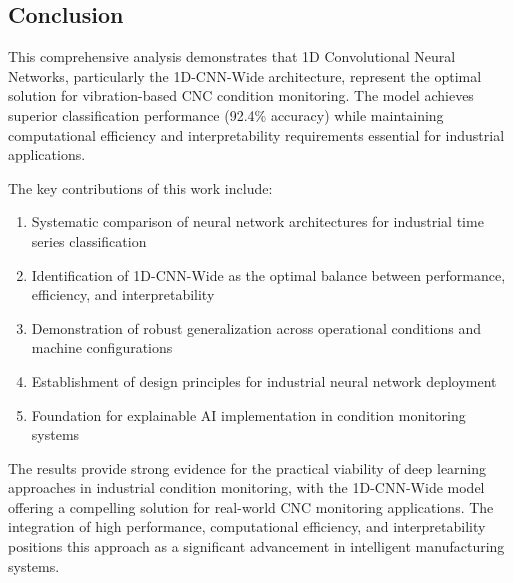 \documentclass[12pt]{article}
\begin{document}
\subsection{Conclusion}

This comprehensive analysis demonstrates that 1D Convolutional Neural Networks, particularly the 1D-CNN-Wide architecture, represent the optimal solution for vibration-based CNC condition monitoring. The model achieves superior classification performance (92.4\% accuracy) while maintaining computational efficiency and interpretability requirements essential for industrial applications.

The key contributions of this work include:
\begin{enumerate}
    \item Systematic comparison of neural network architectures for industrial time series classification
    \item Identification of 1D-CNN-Wide as the optimal balance between performance, efficiency, and interpretability
    \item Demonstration of robust generalization across operational conditions and machine configurations  
    \item Establishment of design principles for industrial neural network deployment
    \item Foundation for explainable AI implementation in condition monitoring systems
\end{enumerate}

The results provide strong evidence for the practical viability of deep learning approaches in industrial condition monitoring, with the 1D-CNN-Wide model offering a compelling solution for real-world CNC monitoring applications. The integration of high performance, computational efficiency, and interpretability positions this approach as a significant advancement in intelligent manufacturing systems.
\end{document}
